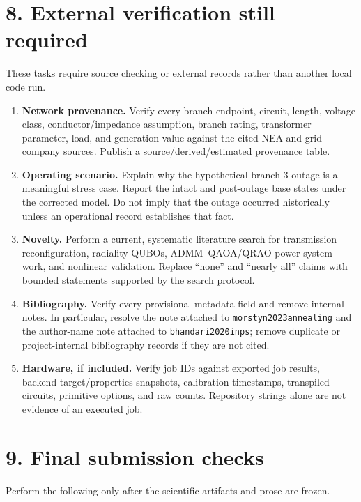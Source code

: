 \documentclass[11pt]{article}
\begin{document}
\section*{8. External verification still required}

These tasks require source checking or external records rather than another
local code run.

\begin{enumerate}
  \item \textbf{Network provenance.}  Verify every branch endpoint, circuit,
  length, voltage class, conductor/impedance assumption, branch rating,
  transformer parameter, load, and generation value against the cited NEA and
  grid-company sources.  Publish a source/derived/estimated provenance table.
  \item \textbf{Operating scenario.}  Explain why the hypothetical branch-3
  outage is a meaningful stress case.  Report the intact and post-outage base
  states under the corrected model.  Do not imply that the outage occurred
  historically unless an operational record establishes that fact.
  \item \textbf{Novelty.}  Perform a current, systematic literature search for
  transmission reconfiguration, radiality QUBOs, ADMM--QAOA/QRAO power-system
  work, and nonlinear validation.  Replace ``none'' and ``nearly all'' claims
  with bounded statements supported by the search protocol.
  \item \textbf{Bibliography.}  Verify every provisional metadata field and
  remove internal notes.  In particular, resolve the note attached to
  \texttt{morstyn2023annealing} and the author-name note attached to
  \texttt{bhandari2020inps}; remove duplicate or project-internal bibliography
  records if they are not cited.
  \item \textbf{Hardware, if included.}  Verify job IDs against exported job
  results, backend target/properties snapshots, calibration timestamps,
  transpiled circuits, primitive options, and raw counts.  Repository strings
  alone are not evidence of an executed job.
\end{enumerate}

\section*{9. Final submission checks}

Perform the following only after the scientific artifacts and prose are
frozen.
\end{document}

